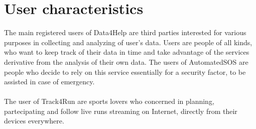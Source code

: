 \section{User characteristics}
The main registered users of Data4Help are third parties interested for various purposes in collecting and analyzing of user's data.
Users are people of all kinds, who want to keep track of their data in time and take advantage of the services derivative from the analysis of their own data. The users of AutomatedSOS are people who decide to rely on this service essentially for a security factor, to be assisted in case of emergency.
\\ \\The user of Track4Run are sports lovers who concerned in planning, partecipating and follow live runs streaming on Internet, directly from their devices everywhere.
 


